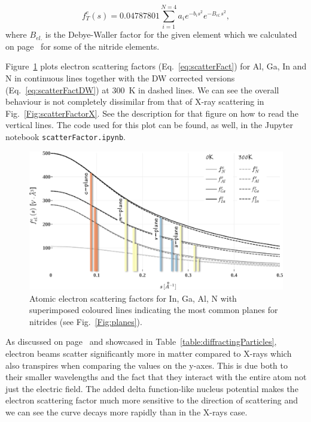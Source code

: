 \begin{equation}
\label{eq:scatterFactDW}
f_T^e(s) = 0.04787801\sum_{i=1}^{N=4} a_i e^{-b_i s^2}  e^{-B_{el.} s^2},
\end{equation}
where $B_{el.}$ is the Debye-Waller factor for the given element which we calculated on page~\pageref{Sec:DWf} for some of the nitride elements.

Figure~\ref{Fig:scatterFactor_e} plots electron scattering factors (Eq.~\ref{eq:scatterFact}) for Al, Ga, In and N in continuous lines together with the DW corrected versions (Eq.~\ref{eq:scatterFactDW}) at \SI{300}{K} in dashed lines. We can see the overall behaviour is not completely dissimilar from that of X-ray scattering in Fig.~\ref{Fig:scatterFactorX}. See the description for that figure on how to read the vertical lines. The code used for this plot can be found, as well, in the Jupyter notebook {\tt scatterFactor.ipynb}. 


\begin{figure}
    \centering
\includegraphics[width=1\linewidth]{Figures/scatterFactor_ecor.png}
\caption[Atomic electron scattering factors.]{Atomic electron scattering factors for In, Ga, Al, N with superimposed coloured lines indicating the most common planes for nitrides (see Fig.~\ref{Fig:planes}). }
\label{Fig:scatterFactor_e}
\end{figure}


As discussed on page~\pageref{table:diffractingParticles} and showcased in Table~\ref{table:diffractingParticles}, electron beams scatter significantly more in matter compared to X-rays which also transpires when comparing the values on the y-axes. This is due both to their smaller wavelengths and the fact that they interact with the entire atom not just the electric field. The added delta function-like nucleus potential makes the electron scattering factor much more sensitive to the direction of scattering and we can see the curve decays more rapidly than in the X-rays case. 


